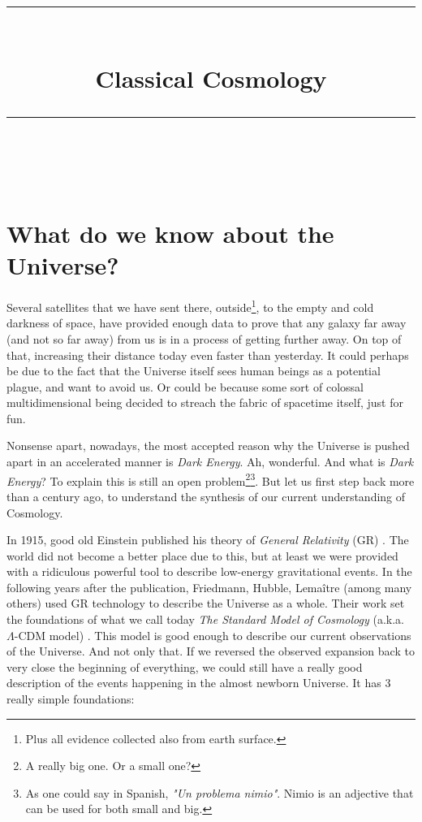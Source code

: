 \documentclass[11pt, a4paper]{article} %
\title{	
	\normalfont\normalsize
	\textsc{}\\ %
	\vspace{5pt} %
	\rule{\linewidth}{0.2pt}\\ %
	\vspace{10pt} %
	{\huge Classical Cosmology}\\ %
	\vspace{5pt} %
	\rule{\linewidth}{-2pt}\\ %
	\vspace{-25pt} %
	\date{}
}
\author{}
\begin{document}
\maketitle 



\section*{What do we know about the Universe?}

Several satellites that we have sent there, outside\footnote{Plus all evidence collected also from earth surface.}, to the empty and cold darkness of space, have provided enough data to prove that any galaxy far away (and not so far away) from us is in a process of getting further away. On top of that, increasing their distance today even faster than yesterday. It could perhaps be due to the fact that the Universe itself sees human beings as a potential plague, and want to avoid us. Or could be because some sort of colossal multidimensional being decided to streach the fabric of spacetime itself, just for fun.

Nonsense apart, nowadays, the most accepted reason why the Universe is pushed apart in an accelerated manner is \textit{Dark Energy}. Ah, wonderful. And what is \textit{Dark Energy}? To explain this is still an open problem\footnote{A really big one. Or a small one?}\footnote{As one could say in Spanish, \textit{"Un problema nimio"}. Nimio is an adjective that can be used for both small and big.}. But let us first step back more than a century ago, to understand the synthesis of our current understanding of Cosmology.


In 1915, good old Einstein published his theory of \textit{General Relativity} (GR) \cite{einstein1915feldgleichungen}. The world did not become a better place due to this, but at least we were provided with a ridiculous powerful tool to describe low-energy gravitational events. In the following years after the publication, Friedmann, Hubble, Lema\^itre \cite{} (among many others) used GR technology to describe the Universe as a whole. Their work set the foundations of what we call today \textit{The Standard Model of Cosmology} (a.k.a. $\Lambda$-CDM model) \cite{}. This model is good enough to describe our current observations of the Universe. And not only that. If we reversed the observed expansion back to very close the beginning of everything, we could still have a really good description of the events happening in the almost newborn Universe. It has 3 really simple foundations:
\end{document}

